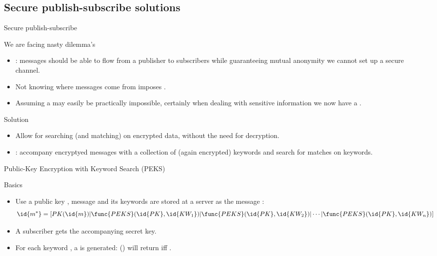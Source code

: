 \subsection{Secure publish-subscribe solutions}
\begin{slide}{Secure publish-subscribe}
  \begin{alertblock}{We are facing nasty dilemma's}
    \begin{itemize}
    \item {}: messages should be able to flow from a publisher to subscribers while
      guaranteeing mutual anonymity \mathexpr{\Rightarrow} we cannot set up a secure channel.
    \item Not knowing where messages come from imposes .
    \item Assuming a  may easily be practically impossible, certainly when dealing with
      sensitive information \mathexpr{\Rightarrow} we now have a .
    \end{itemize}
  \end{alertblock}
  \onslide
  \begin{block}{Solution}
    \begin{itemize}
    \item Allow for searching (and matching) on encrypted data, without the need for decryption.
    \item {}: accompany encryptyed messages with a collection of (again encrypted) keywords and
      search for matches on keywords.
    \end{itemize}
  \end{block}
\end{slide}
\begin{slide}{Public-Key Encryption with Keyword Search (PEKS)}
  \begin{block}{Basics}
    \begin{itemize}
    \item Use a public key , message  and its  keywords
       are stored at a server as the message :
      \[
      \id{m^*} = [ PK(\id{m}) | \func{PEKS}(\id{PK}, \id{KW_1}) | \func{PEKS}(\id{PK}, \id{KW_2}) | \cdots |
        \func{PEKS}(\id{PK}, \id{KW_n}) ]
      \]
    \item A subscriber gets the accompanying secret key.
    \item For each keyword , a   is generated: () will
      return  iff .
    \end{itemize}
  \end{block}
  \begin{centerfig}
     \\
    {\footnotesize {}}
  \end{centerfig}
\end{slide}
